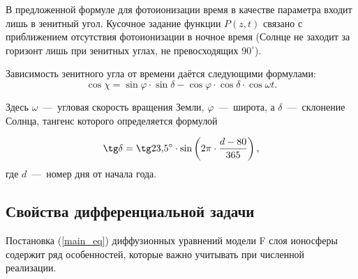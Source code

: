 \documentclass[14pt, a4paper]{extarticle}
\begin{document}
\medskip


В предложенной формуле для фотоионизации время в качестве параметра входит лишь в зенитный угол. Кусочное задание функции $P(z, t)$ связано с приближением отсутствия фотоионизации в ночное время (Солнце не заходит за горизонт лишь при зенитных углах, не превосходящих $90^\circ$).

Зависимость зенитного угла от времени даётся следующими формулами: \begin{equation}\cos\chi = \sin\varphi\cdot\sin\delta-\cos\varphi\cdot\cos\delta\cdot\cos\omega t.\end{equation}

Здесь $\omega$~---~угловая скорость вращения Земли, $\varphi$~---~широта, а $\delta$~---~склонение Солнца, тангенс которого определяется формулой 

\begin{equation}\tg\delta = \tg 23{,}5^\circ \cdot \sin\left(2\pi\cdot\dfrac{d-80}{365}\right),\end{equation} где $d$~---~номер дня от начала года.




\subsection{Свойства дифференциальной задачи}

Постановка (\ref{main_eq}) диффузионных уравнений модели F слоя ионосферы содержит ряд особенностей, которые важно учитывать при численной реализации.
\end{document}
